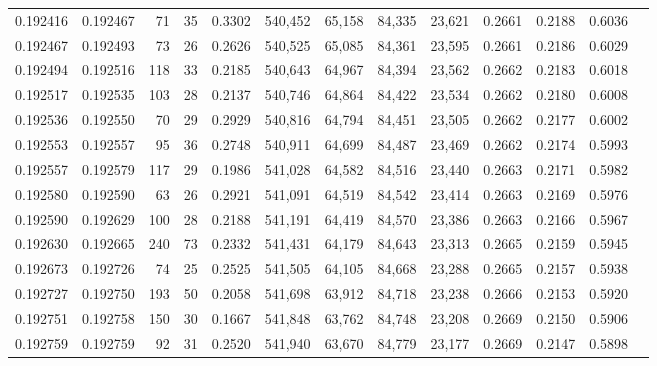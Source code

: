 \begin{tabular}{rrrrrrrrrrrrr}
0.192416 & 0.192467 &    71 &  35 &                                     0.3302 & 540,452 &  65,158 &  84,335 &  23,621 & 0.2661 & 0.2188 & 0.6036 \\
0.192467 & 0.192493 &    73 &  26 &                                     0.2626 & 540,525 &  65,085 &  84,361 &  23,595 & 0.2661 & 0.2186 & 0.6029 \\
0.192494 & 0.192516 &   118 &  33 &                                     0.2185 & 540,643 &  64,967 &  84,394 &  23,562 & 0.2662 & 0.2183 & 0.6018 \\
0.192517 & 0.192535 &   103 &  28 &                                     0.2137 & 540,746 &  64,864 &  84,422 &  23,534 & 0.2662 & 0.2180 & 0.6008 \\
0.192536 & 0.192550 &    70 &  29 &                                     0.2929 & 540,816 &  64,794 &  84,451 &  23,505 & 0.2662 & 0.2177 & 0.6002 \\
0.192553 & 0.192557 &    95 &  36 &                                     0.2748 & 540,911 &  64,699 &  84,487 &  23,469 & 0.2662 & 0.2174 & 0.5993 \\
0.192557 & 0.192579 &   117 &  29 &                                     0.1986 & 541,028 &  64,582 &  84,516 &  23,440 & 0.2663 & 0.2171 & 0.5982 \\
0.192580 & 0.192590 &    63 &  26 &                                     0.2921 & 541,091 &  64,519 &  84,542 &  23,414 & 0.2663 & 0.2169 & 0.5976 \\
0.192590 & 0.192629 &   100 &  28 &                                     0.2188 & 541,191 &  64,419 &  84,570 &  23,386 & 0.2663 & 0.2166 & 0.5967 \\
0.192630 & 0.192665 &   240 &  73 &                                     0.2332 & 541,431 &  64,179 &  84,643 &  23,313 & 0.2665 & 0.2159 & 0.5945 \\
0.192673 & 0.192726 &    74 &  25 &                                     0.2525 & 541,505 &  64,105 &  84,668 &  23,288 & 0.2665 & 0.2157 & 0.5938 \\
0.192727 & 0.192750 &   193 &  50 &                                     0.2058 & 541,698 &  63,912 &  84,718 &  23,238 & 0.2666 & 0.2153 & 0.5920 \\
0.192751 & 0.192758 &   150 &  30 &                                     0.1667 & 541,848 &  63,762 &  84,748 &  23,208 & 0.2669 & 0.2150 & 0.5906 \\
0.192759 & 0.192759 &    92 &  31 &                                     0.2520 & 541,940 &  63,670 &  84,779 &  23,177 & 0.2669 & 0.2147 & 0.5898 \\

\end{tabular}
